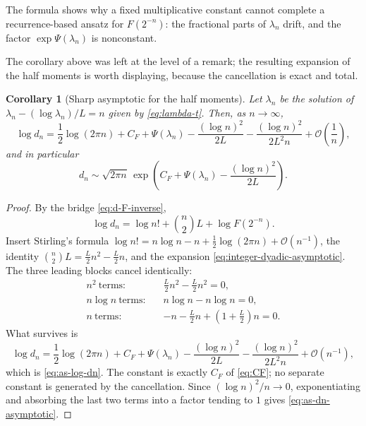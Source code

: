 \documentclass[11pt,oneside]{article}
\newtheorem{corollary}[theorem]{Corollary}
\theoremstyle{definition}
\theoremstyle{remark}
\newcommand{\bigO}{\mathcal O}
\begin{document}
The formula shows why a fixed multiplicative constant cannot complete a recurrence-based
ansatz for $F(2^{-n})$: the fractional parts of $\lambda_n$ drift, and the factor
$\exp\Psi(\lambda_n)$ is nonconstant.

The corollary above was left at the level of a remark; the resulting expansion of the half
moments is worth displaying, because the cancellation is exact and total.

\begin{corollary}[Sharp asymptotic for the half moments]
\label{cor:as-dn}
Let $\lambda_n$ be the solution of $\lambda_n-(\log\lambda_n)/L=n$ given by
\eqref{eq:lambda-t}.  Then, as $n\to\infty$,
\begin{equation}
 \log d_n=\frac12\log(2\pi n)+C_F+\Psi(\lambda_n)
 -\frac{(\log n)^{2}}{2L}-\frac{(\log n)^{2}}{2L^{2}n}
 +\bigO\!\left(\frac1n\right),                            \label{eq:as-log-dn}
\end{equation}
and in particular
\begin{equation}
 \boxed{
 d_n\sim\sqrt{2\pi n}\,
 \exp\!\left(C_F+\Psi(\lambda_n)-\frac{(\log n)^{2}}{2L}\right).}
                                                          \label{eq:as-dn-asymptotic}
\end{equation}
\end{corollary}

\begin{proof}
By the bridge \eqref{eq:d-F-inverse},
\begin{equation}
 \log d_n=\log n!+\binom n2L+\log F(2^{-n}).              \label{eq:as-dn-bridge}
\end{equation}
Insert Stirling's formula $\log n!=n\log n-n+\tfrac12\log(2\pi n)+\bigO(n^{-1})$, the
identity $\binom n2L=\tfrac L2n^{2}-\tfrac L2n$, and the expansion
\eqref{eq:integer-dyadic-asymptotic}.  The three leading blocks cancel identically:
\begin{align*}
 n^{2}\ \text{terms:}\quad&\frac L2n^{2}-\frac L2n^{2}=0,\\
 n\log n\ \text{terms:}\quad&n\log n-n\log n=0,\\
 n\ \text{terms:}\quad&-n-\frac L2n+\left(1+\frac L2\right)n=0.
\end{align*}
What survives is
\begin{equation*}
 \log d_n=\frac12\log(2\pi n)+C_F+\Psi(\lambda_n)
 -\frac{(\log n)^{2}}{2L}-\frac{(\log n)^{2}}{2L^{2}n}+\bigO(n^{-1}),
\end{equation*}
which is \eqref{eq:as-log-dn}.  The constant is exactly $C_F$ of \eqref{eq:CF}; no separate
constant is generated by the cancellation.  Since $(\log n)^{2}/n\to0$, exponentiating and
absorbing the last two terms into a factor tending to $1$ gives
\eqref{eq:as-dn-asymptotic}.
\end{proof}
\end{document}
